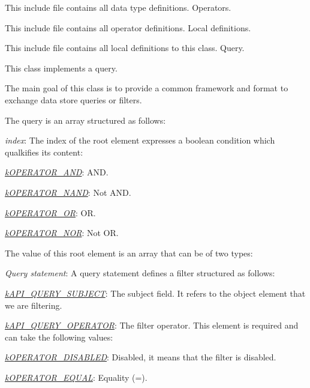 This include file contains all data type definitions. Operators.

This include file contains all operator definitions. Local definitions.

This include file contains all local definitions to this class. Query.

This class implements a query.

The main goal of this class is to provide a common framework and format to exchange data store queries or filters.

The query is an array structured as follows\-:


\begin{DoxyItemize}
\item {\itshape index\/}\-: The index of the root element expresses a boolean condition which qualkifies its content\-: 
\begin{DoxyItemize}
\item {\itshape \hyperlink{}{k\-O\-P\-E\-R\-A\-T\-O\-R\-\_\-\-A\-N\-D}\/}\-: A\-N\-D. 
\item {\itshape \hyperlink{}{k\-O\-P\-E\-R\-A\-T\-O\-R\-\_\-\-N\-A\-N\-D}\/}\-: Not A\-N\-D. 
\item {\itshape \hyperlink{}{k\-O\-P\-E\-R\-A\-T\-O\-R\-\_\-\-O\-R}\/}\-: O\-R. 
\item {\itshape \hyperlink{}{k\-O\-P\-E\-R\-A\-T\-O\-R\-\_\-\-N\-O\-R}\/}\-: Not O\-R. 
\end{DoxyItemize}The value of this root element is an array that can be of two types\-: 
\begin{DoxyItemize}
\item {\itshape Query statement\/}\-: A query statement defines a filter structured as follows\-: 
\begin{DoxyItemize}
\item {\itshape \hyperlink{}{k\-A\-P\-I\-\_\-\-Q\-U\-E\-R\-Y\-\_\-\-S\-U\-B\-J\-E\-C\-T}\/}\-: The subject field. It refers to the object element that we are filtering. 
\item {\itshape \hyperlink{}{k\-A\-P\-I\-\_\-\-Q\-U\-E\-R\-Y\-\_\-\-O\-P\-E\-R\-A\-T\-O\-R}\/}\-: The filter operator. This element is required and can take the following values\-: 
\begin{DoxyItemize}
\item {\itshape \hyperlink{}{k\-O\-P\-E\-R\-A\-T\-O\-R\-\_\-\-D\-I\-S\-A\-B\-L\-E\-D}\/}\-: Disabled, it means that the filter is disabled. 
\item {\itshape \hyperlink{}{k\-O\-P\-E\-R\-A\-T\-O\-R\-\_\-\-E\-Q\-U\-A\-L}\/}\-: Equality (=). 

\end{DoxyItemize}
\end{DoxyItemize}
\end{DoxyItemize}
\end{DoxyItemize}
